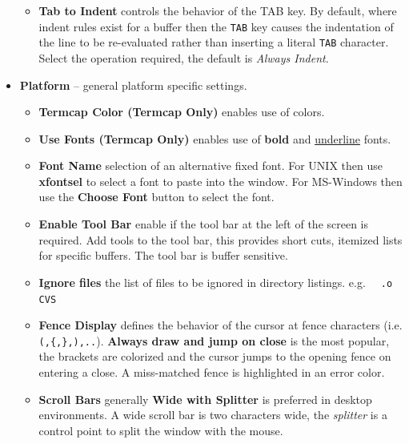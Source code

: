 \documentclass[11pt,a4paper,pdftex]{article}
\begin{document}
\begin{itemize}
\begin{itemize}
\begin{itemize}
      \end{itemize}

      \item \textbf{Tab to Indent} controls the behavior of the TAB key. By
      default, where indent rules exist for a buffer then the \texttt{TAB} key
      causes the indentation of the line to be re-evaluated rather than
      inserting a literal \texttt{TAB} character. Select the operation
      required, the default is \textit{Always Indent}.

    \end{itemize}

    \item \textbf{Platform} -- general platform specific settings.

    \begin{itemize}

      \item \textbf{Termcap Color (Termcap Only)} enables use of colors.

      \item \textbf{Use Fonts (Termcap Only)} enables use of \textbf{bold} and
      \underline{underline} fonts.

      \item \textbf{Font Name} selection of an alternative fixed font. For
      UNIX then use \textbf{xfontsel} to select a font to paste into the
      window. For MS-Windows then use the \textbf{Choose Font} button to
      select the font.

      \item \textbf{Enable Tool Bar} enable if the tool bar at the left of the
      screen is required. Add tools to the tool bar, this provides short cuts,
      itemized lists for specific buffers. The tool bar is buffer sensitive.

      \item \textbf{Ignore files} the list of files to be ignored in directory
      listings. e.g. \texttt{~ .o CVS}

      \item \textbf{Fence Display} defines the behavior of the cursor at fence
      characters (i.e. \texttt{(,\{,\},),..}). \textbf{Always draw and jump on
      close} is the most popular, the brackets are colorized and the cursor
      jumps to the opening fence on entering a close. A miss-matched fence is
      highlighted in an error color.

      \item \textbf{Scroll Bars} generally \textbf{Wide with Splitter} is
      preferred in desktop environments. A wide scroll bar is two characters
      wide, the \textit{splitter} is a control point to split the window with
      the mouse.


\end{itemize}
\end{itemize}
\end{document}
